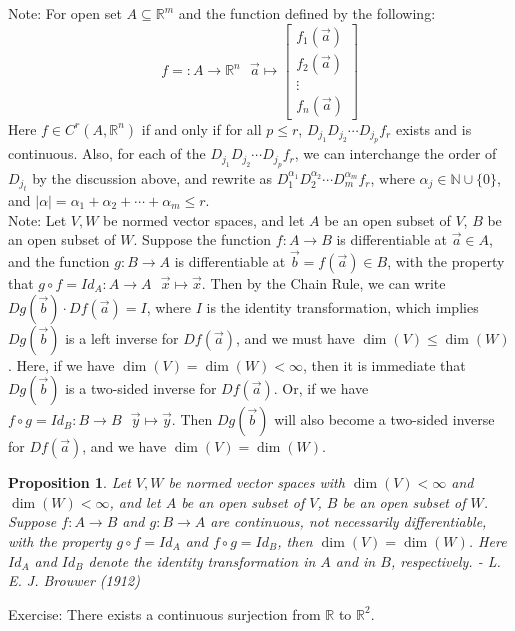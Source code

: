\documentclass[15pt]{book}
\theoremstyle{break}
\theoremstyle{break}
\newtheorem{prop}[lem]{Proposition}
\newcommand{\R}{\mathbb{R}}
\newcommand{\N}{\mathbb{N}}
\newcommand{\note}{\color{red}Note: \color{black}}
\newcommand{\exercise}{\color{green}Exercise: \color{black}}
\begin{document}
\note For open set $A\subseteq \R^m$ and the function defined by the following: $$f =: A \to \R^n \ \ \ \vec{a}\mapsto  \begin{bmatrix} f_1(\vec{a})\\f_2(\vec{a})\\\vdots\\f_n (\vec{a})\end{bmatrix}$$ 
Here $f\in C^r(A,\R^n)$ if and only if for all $p\leq r$, $D_{j_1} D_{j_2}\cdots D_{j_p}f_r$ exists and is continuous. Also, for each of the $D_{j_1} D_{j_2}\cdots D_{j_p}f_r$, we can interchange the order of $D_{j_t}$ by the discussion above, and rewrite as $D_1^{\alpha_1}D_2^{\alpha_2}\cdots D_m^{\alpha_m}f_r$, where $\alpha_j \in \N\cup \{0\}$, and $|\alpha| = \alpha_1+\alpha_2+\cdots +\alpha_m \leq r$. \\

\note Let $V,W$ be normed vector spaces, and let $A$ be an open subset of $V$, $B$ be an open subset of $W$. Suppose the function $f:A \to B$ is differentiable at $\vec{a}\in A$, and the function $g:B \to A$ is differentiable at $\vec{b} = f(\vec{a}) \in B$, with the property that $g\circ f = Id_A : A \to A \ \ \ \vec{x}\mapsto \vec{x}$. Then by the Chain Rule, we can write $Dg(\vec{b})\cdot Df(\vec{a}) = I$, where $I$ is the identity transformation, which implies $Dg(\vec{b})$ is a left inverse for $Df(\vec{a})$, and we must have $\dim(V) \leq \dim(W)$. Here, if we have $\dim(V) = \dim(W)< \infty$, then  it is immediate that $Dg(\vec{b})$ is a two-sided inverse for $Df(\vec{a})$. Or, if we have $f\circ g = Id_B: B \to B \ \ \ \vec{y}\mapsto \vec{y}$. Then $Dg(\vec{b})$ will also become a two-sided inverse for $Df(\vec{a})$, and we have $\dim(V) = \dim(W)$.\\

\begin{prop}
Let $V,W$ be normed vector spaces with $\dim(V)<\infty$ and $\dim(W) < \infty$, and let $A$ be an open subset of $V$, $B$ be an open subset of $W$. Suppose $f:A \to B$ and $g:B \to A$ are continuous, not necessarily differentiable, with the property $g\circ f = Id_A$ and $f\circ g = Id_B$, then $\dim(V) = \dim(W)$. Here $Id_A$ and $Id_B$ denote the identity transformation in $A$ and in $B$, respectively. \hfill - L. E. J. Brouwer (1912)
\end{prop}

\hfill\break

\exercise There exists a continuous surjection from $\R$ to $\R^2$.\\
\end{document}

